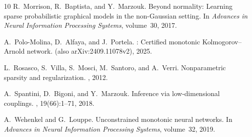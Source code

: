 \documentclass[11pt,a4paper]{article}
\theoremstyle{plain}
\theoremstyle{definition}
\theoremstyle{remark}
\begin{document}
\begin{thebibliography}{10}
R.~Morrison, R.~Baptista, and Y.~Marzouk.
\newblock Beyond normality: Learning sparse probabilistic graphical models in the non-{G}aussian setting.
\newblock In {\em Advances in Neural Information Processing Systems}, volume~30, 2017.

A.~Polo-Molina, D.~Alfaya, and J.~Portela.
: Certified monotonic {K}olmogorov--{A}rnold network.
 (also arXiv:2409.11078v2), 2025.

L.~Rosasco, S.~Villa, S.~Mosci, M.~Santoro, and A.~Verri.
\newblock Nonparametric sparsity and regularization.
, 2012.

A.~Spantini, D.~Bigoni, and Y.~Marzouk.
\newblock Inference via low-dimensional couplings.
, 19(66):1--71, 2018.

A.~Wehenkel and G.~Louppe.
\newblock Unconstrained monotonic neural networks.
\newblock In {\em Advances in Neural Information Processing Systems}, volume~32, 2019.

\end{thebibliography}
\end{document}
